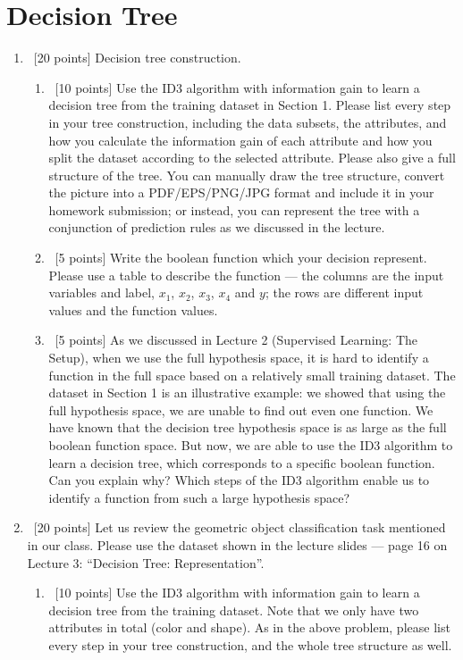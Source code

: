 \documentclass[12pt, fullpage,letterpaper]{article}
\begin{document}
\section{Decision Tree}

\begin{enumerate}
\item~[20 points] Decision tree construction. 
\begin{enumerate}
\item~[10 points] Use the ID3 algorithm with information gain to learn a decision tree from the training dataset in Section 1. Please list every step in your tree construction, including the data subsets, the attributes, and how you calculate the information gain of each attribute and how you split the dataset according to the selected attribute. Please also give a full structure of the tree. You can manually  draw the tree structure,  convert the picture into a PDF/EPS/PNG/JPG format and include it in your homework submission; or instead, you can  represent the tree with a conjunction of prediction rules as we discussed in the lecture. 
\item~[5 points] Write the boolean function which your decision represent. Please use a table to describe the function --- the columns are the input variables and label, \ie $x_1$, $x_2$, $x_3$, $x_4$ and $y$; the rows are different input values and the function values. 
\item~[5 points] As we discussed in Lecture 2 (Supervised Learning: The Setup),  when we use the full hypothesis space, it is hard to  identify a function in the full space based on  a relatively small training dataset. The dataset in Section 1 is an illustrative  example: we showed that using the full hypothesis space, we are unable to find out even one function.  We have known that the decision tree hypothesis space is as large as the full boolean function space. But now, we are able to use the ID3 algorithm to learn a decision tree, which corresponds to a specific boolean function. Can you explain why? Which steps of the ID3 algorithm enable us to identify a function from such a large hypothesis space?  
\end{enumerate}
\item~[20 points] Let us review the geometric object classification task mentioned in our class. Please use the dataset shown in the lecture slides --- page 16 on Lecture 3: ``Decision Tree: Representation''. 
\begin{enumerate}
\item~[10 points] Use the ID3 algorithm with information gain to learn a decision tree from the training dataset. Note that we only have two attributes in total (color and shape). As in the above problem, please list every step in your tree construction, and the whole tree structure as well. 

\end{enumerate}
\end{enumerate}
\end{document}
